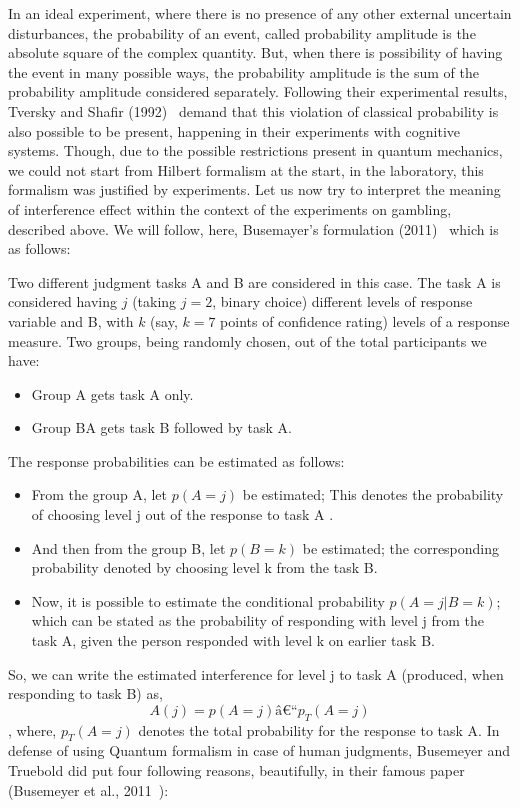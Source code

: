 \documentclass[review]{elsarticle}
\begin{document}
In an ideal experiment, where there is no presence of any other external uncertain disturbances, the probability of an event, called probability amplitude is the absolute square of the complex quantity. But, when there is possibility of having the event in many possible ways, the probability amplitude is the sum of the probability amplitude considered separately. Following their experimental results, Tversky and Shafir (1992)~\cite{tversky1992choice} demand that this violation of classical probability is also possible to be present, happening in their experiments with cognitive systems. Though, due to the possible restrictions present in quantum mechanics, we could not start from Hilbert formalism at the start, in the laboratory, this formalism was justified by experiments.
Let us now try to interpret the meaning of interference effect within the context of the experiments on gambling, described above. We will follow, here, Busemayer's formulation (2011)~\cite{busemeyer2011quantum} which is as follows:

Two different judgment tasks A and B are considered in this case. The task A is considered having $j$ (taking $j= 2$, binary choice) different levels of response variable and B, with $k$ (say, $k= 7$ points of confidence rating) levels of a response measure. Two groups, being randomly chosen, out of the total participants we have: 

\begin{itemize}
\item Group A gets task A only.
\item Group BA gets task B followed by task A. 
\end{itemize}

The response probabilities can be estimated as follows:
\begin{itemize}
\item From  the group A,  let   $p( A = j)$ be estimated;  This denotes  the probability of choosing level j out of the response to task A .
\item And then from the group B, let $p(B=k)$ be estimated; the corresponding probability denoted  by choosing level k from the task B.
\item Now, it is possible to estimate the conditional probability $p (A=j|B=k)$; which can be stated as the probability of responding with level j from the task A, given the person responded with level k on earlier task B.
\end{itemize}

So, we can write the estimated interference for level j to task A (produced, when responding to task B) as,  
                                     $$ A (j) = p (A = j) â p_T (A = j)$$,
where,  $p_T (A = j)$  denotes the total probability for the response to task A.
In defense of using Quantum formalism in case of human judgments, Busemeyer and Truebold did put four following reasons, beautifully, in their famous paper (Busemeyer et al., 2011~\cite{busemeyer2011quantum}):
\end{document}

